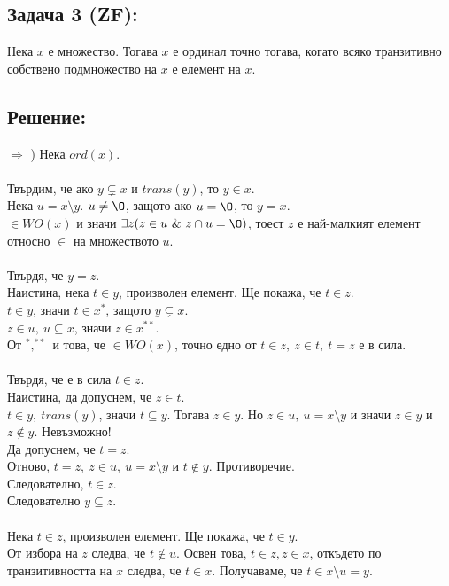 \documentclass[french]{article}
\begin{document}
    \subsection*{Задача 3 (ZF):}
    Нека $x$ е множество. Тогава $x$ е ординал точно тогава,
    когато всяко транзитивно собствено подмножество на $x$ е елемент на $x$.
    
	\subsection*{Решение:}
	$\Longrightarrow$ ) Нека $ord(x)$. \\
	\\
	Твърдим, че ако $y \subsetneq x$ и $trans(y)$, то $y \in x$. \\
	Нека $u = x \setminus y$. $u \not= {\O}$, защото ако $u = {\O}$, то $y = x$. \\
	$\in WO(x)$ и значи $\exists z (z \in u\ \&\ z \cap u = {\O})$, тоест $z$ е най-малкият елемент относно $\in$ на множеството $u$. \\
	\\
	Твърдя, че $y = z$. \\
	Наистина, нека $t \in y$, произволен елемент. Ще покажа, че $t \in z$. \\
	$t \in y$, значи $t \in x^*$, защото $y \subsetneq x$. \\ 
	$z \in u,\ u \subseteq x$, значи $z \in x^{**}$. \\
	От $^*, ^{**}$ и това, че $\in WO(x)$, точно едно от $t \in z,\ z \in t,\ t = z$ е в сила. \\
	\\
	Твърдя, че е в сила $t \in z$. \\
	Наистина, да допуснем, че $z \in t$. \\
	$t \in y,\ trans(y)$, значи $t \subseteq y$. Тогава $z \in y$. Но $z \in u,\ u = x \setminus y$ и значи $z \in y$ и $z \notin y$. Невъзможно! \\
	Да допуснем, че $t = z$. \\
	Отново, $t = z,\ z \in u,\ u = x \setminus y$ и $t \notin y$. Противоречие. \\
	Следователно, $t \in z$. \\
	Следователно $y \subseteq z$. \\
	\\
	Нека $t \in z$, произволен елемент. Ще покажа, че $t \in y$. \\
	От избора на $z$ следва, че $t \notin u$. Освен това, $t \in z, z \in x$, откъдето по транзитивността на $x$ следва, че $t \in x$. Получаваме, че $t \in x \setminus u = y$. \\
\end{document}
